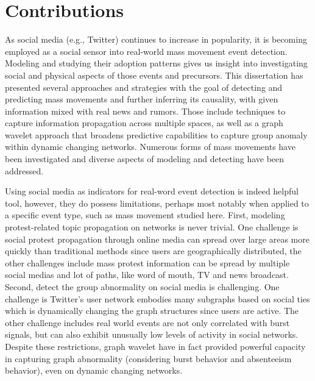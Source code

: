 \section{Contributions}
As social media (e.g., Twitter) continues to increase in popularity, it is becoming employed
as a social sensor into real-world mass movement event detection. Modeling and studying their adoption patterns gives us insight into investigating social and physical aspects of those events and precursors. This dissertation has presented several approaches and strategies with the goal of detecting and predicting mass movements and further inferring its causality, with given information mixed with real news and rumors. Those include techniques to capture information propagation across multiple spaces, as well as a graph wavelet approach that broadens predictive capabilities to capture group anomaly within dynamic changing networks. Numerous forms of mass movements have been investigated and diverse aspects of modeling and detecting have been addressed.

Using social media as indicators for real-word event detection is indeed helpful tool, however, they do possess limitations, perhaps most notably when applied to a specific event type, such as mass movement studied here. First, modeling protest-related topic propagation on networks is never trivial. One challenge is social protest propagation through online media can spread over large areas more quickly than traditional methods since users are geographically distributed, the other challenges include mass protest information can be spread by multiple social medias and lot of paths, like word of mouth, TV and news broadcast. Second, detect the group abnormality on social media is challenging. One challenge is Twitter's user network embodies many subgraphs based on social ties which is dynamically changing the graph structures since users are active. The other challenge includes real world events are not only correlated with burst signals, but can also exhibit unusually low levels of activity in social networks.
Despite these restrictions, graph wavelet have in fact provided powerful capacity in capturing graph abnormality (considering burst behavior and absenteeism behavior), even on dynamic changing networks.


